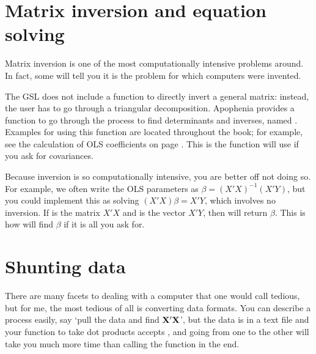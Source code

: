 \section{Matrix inversion and equation solving}  
Matrix inversion is one of the most computationally intensive problems
around. In fact, some will tell you it is the problem for which computers were invented.

The GSL does not include a function to directly invert a general matrix:
instead, the user has to go through a triangular decomposition.
Apophenia provides a function to go through the process to find
determinants and inverses, named .
Examples for using this function are located throughout the book; for
example, see the calculation of OLS coefficients on page \pageref{ols}.
This is the function  will use if you ask for covariances.

Because inversion is so computationally intensive, you are better off
not doing so.  For example, we often write the OLS parameters as $\beta
=(X'X)^{-1}(X'Y)$, but you could implement this as solving
$(X'X)\beta = X'Y$, which involves no inversion. If  is the
matrix $X'X$ and  is the vector $X'Y$, then 
 will
return $\beta$. This is how  will find $\beta$ if it
is all you ask for.


\section{Shunting data} \label{asst_conversions} 
There are many facets to dealing with a computer that one would call
tedious, but for me, the most tedious of all is converting data formats.
You can describe a process easily, say `pull the data and find
${\bf X}'{\bf X}$', but the data is in a text file and your function to take dot
products accepts , and going from one
to the other will take you much more time than calling the function in
the end.


